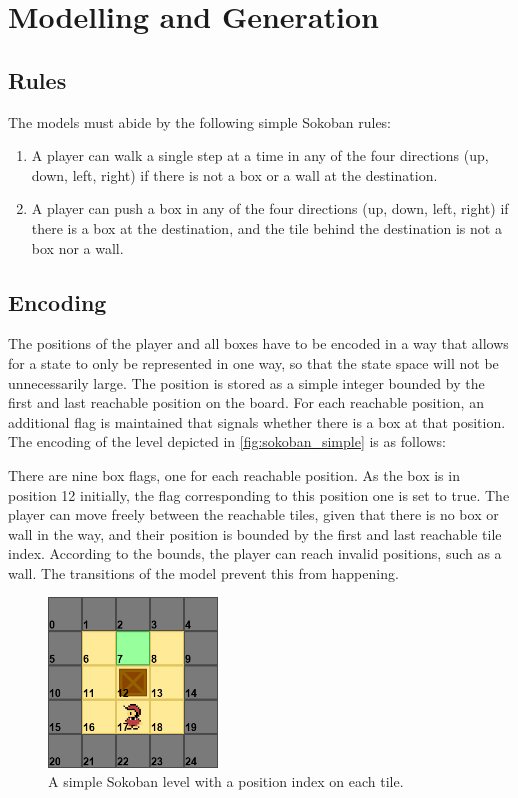 \section{Modelling and Generation}

\subsection{Rules}
The models must abide by the following simple Sokoban rules: 
\begin{enumerate}
    \item A player can walk a single step at a time in any of the four directions (up, down, left, right) if there is not a box or a wall at the destination.
    \item A player can push a box in any of the four directions (up, down, left, right) if there is a box at the destination, and the tile behind the destination is not a box nor a wall.
\end{enumerate}

\subsection{Encoding}
The positions of the player and all boxes have to be encoded in a way that allows for a state to only be represented in one way, so that the state space will not be unnecessarily large. The position is stored as a simple integer bounded by the first and last reachable position on the board. For each reachable position, an additional flag is maintained that signals whether there is a box at that position. The encoding of the level depicted in \autoref{fig:sokoban_simple} is as follows:

There are nine box flags, one for each reachable position. As the box is in position 12 initially, the flag corresponding to this position one is set to true. The player can move freely between the reachable tiles, given that there is no box or wall in the way, and their position is bounded by the first and last reachable tile index. According to the bounds, the player can reach invalid positions, such as a wall. The transitions of the model prevent this from happening.

\begin{figure}[h]
    \centering
    \includegraphics[width=4.5cm]{images/sokoban_simple.png}
    \caption{A simple Sokoban level with a position index on each tile.}
    \label{fig:sokoban_simple}
\end{figure}

